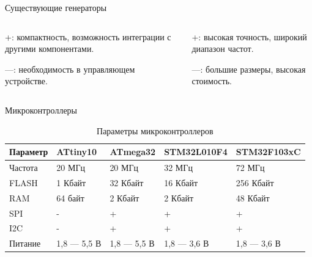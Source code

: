\documentclass[10pt]{beamer}
\begin{document}
\begin{frame}{Существующие генераторы}
\begin{columns}
\begin{column}{0.5\textwidth}
+: компактность, возможность интеграции с другими компонентами.

---: необходимость в управляющем устройстве.
\end{column}
\begin{column}{0.5\textwidth}  
+: высокая точность, широкий диапазон частот.

---: большие размеры, высокая стоимость.
\end{column}
\end{columns}
\end{frame}

\begin{frame}{Микроконтроллеры}
\begin{small}
\begin{table}[H]
\caption*{Параметры микроконтроллеров}
\begin{tabular}{|p{1.5 cm}|p{1.9 cm}|p{1.9 cm}|p{1.9 cm}|p{1.9 cm}|}
\hline
        Параметр & ATtiny10 & ATmega32 & STM32L010F4 & STM32F103xC \\ \hline
        Частота & 20 МГц & 20 МГц & 32 МГц & 72 МГц \\ \hline
        FLASH & 1 Кбайт & 32 Кбайт & 16 Кбайт & 256 Кбайт \\ \hline
        RAM & 64 байт & 2 Кбайт & 2 Кбайт & 48 Кбайт \\ \hline
        SPI & - & + & + & + \\ \hline
        I2C & - & +	 & + & + \\ \hline
        Питание & 1,8 --- 5,5 В & 1,8 --- 5,5 В & 1,8 --- 3,6 В & 1,8 --- 3,6 В \\ \hline
\end{tabular}
\end{table}
\end{small}
\end{frame}
\end{document}
